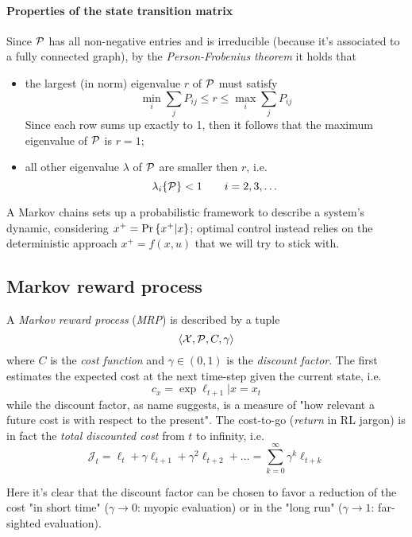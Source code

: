 	\paragraph{Properties of the state transition matrix} Since $\mathcal P$ has all non-negative entries and is irreducible (because it's associated to a fully connected graph), by the \textit{Person-Frobenius theorem} it holds that
	\begin{itemize}
		\item the largest (in norm) eigenvalue $r$ of $\mathcal P$ must satisfy
		\[ \min_i \sum_j P_{ij} \leq r \leq \max_i \sum_j P_{ij} \]
		Since each row sums up exactly to 1, then it follows that the maximum eigenvalue of $\mathcal P$ is $r=1$;
		\item all other eigenvalue $\lambda$ of $\mathcal P$ are smaller then $r$, i.e.
		\[ \lambda_i\{\mathcal P\} < 1 \qquad i = 2,3,\dots\]
	\end{itemize}
	A Markov chains sets up a probabilistic framework to describe a system's dynamic, considering $x^+ = \textrm{Pr}\left\{x^+|x\right\}$; optimal control instead relies on the deterministic approach $x^+ = f(x,u)$ that we will try to stick with.

\subsection*{Markov reward process}
	A \textit{Markov reward process} (\textit{MRP}) is described by a tuple
	\begin{equation} \label{eq:MRP}
		\langle \mathcal X, \mathcal P, C, \gamma \rangle
	\end{equation}
	where $C$ is the \textit{cost function} and $\gamma \in (0,1)$ is the \textit{discount factor}. The first estimates the expected cost at the next time-step given the current state, i.e.
	\[ c_x = \exp{\ell_{t+1} | x = x_t} \]
	while the discount factor, as name suggests, is a measure of "how relevant a future cost is with respect to the present". The cost-to-go (\textit{return} in RL jargon) is in fact the \textit{total discounted cost} from $t$ to infinity, i.e.
	\begin{equation} \label{eq:MRPcost}
		\mathcal J_t = \ell_t + \gamma \ell_{t+1} + \gamma^2 \ell_{t+2} + \dots = \sum_{k=0}^{\infty} \gamma^k \ell_{t+k}
	\end{equation}
	
	Here it's clear that the discount factor can be chosen to favor a reduction of the cost "in short time" ($\gamma \rightarrow 0$: myopic evaluation) or in the "long run" ($\gamma \rightarrow 1$: far-sighted evaluation).
	
